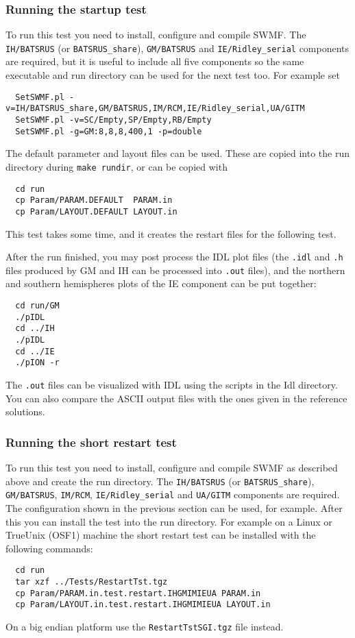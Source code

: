 \documentclass[twoside,10pt]{article}
\begin{document}
\subsubsection{Running the startup test}

To run this test you need to install, configure and compile SWMF.
The {\tt IH/BATSRUS} (or {\tt BATSRUS\_share}), 
{\tt GM/BATSRUS} and {\tt IE/Ridley\_serial}
components are required, but it is useful to include all five
components so the same executable and run directory 
can be used for the next test too. For example set
\begin{verbatim}
  SetSWMF.pl -v=IH/BATSRUS_share,GM/BATSRUS,IM/RCM,IE/Ridley_serial,UA/GITM
  SetSWMF.pl -v=SC/Empty,SP/Empty,RB/Empty
  SetSWMF.pl -g=GM:8,8,8,400,1 -p=double
\end{verbatim}
The default parameter and layout files can be used. 
These are copied into the run directory during {\tt make rundir},
or can be copied with
\begin{verbatim}
  cd run
  cp Param/PARAM.DEFAULT  PARAM.in
  cp Param/LAYOUT.DEFAULT LAYOUT.in
\end{verbatim}
This test takes some time, and it creates the restart files
for the following test. 

After the run finished, you may post process the IDL plot files (the
{\tt .idl} and {\tt .h} files produced by GM and IH can be processed
into {\tt .out} files), and the northern and southern hemispheres
plots of the IE component can be put together: 
\begin{verbatim}
  cd run/GM
  ./pIDL
  cd ../IH
  ./pIDL
  cd ../IE
  ./pION -r
\end{verbatim}
The {\tt .out} files can be visualized with IDL using the scripts in
the Idl directory.  You can also compare the ASCII output files with
the ones given in the reference solutions.

\subsubsection{Running the short restart test}

To run this test you need to install, configure and compile SWMF
as described above and create the run directory. 
The {\tt IH/BATSRUS} (or {\tt BATSRUS\_share}),
{\tt GM/BATSRUS}, {\tt IM/RCM}, {\tt IE/Ridley\_serial} and
{\tt UA/GITM} components are required. The configuration shown
in the previous section can be used, for example.
After this you can install the test into the run directory.  
For example on a Linux or TrueUnix
(OSF1) machine the short restart test can be installed with the
following commands:
\begin{verbatim}
  cd run
  tar xzf ../Tests/RestartTst.tgz
  cp Param/PARAM.in.test.restart.IHGMIMIEUA PARAM.in
  cp Param/LAYOUT.in.test.restart.IHGMIMIEUA LAYOUT.in
\end{verbatim}
On a big endian platform use the {\tt RestartTstSGI.tgz} file instead.
\end{document}
